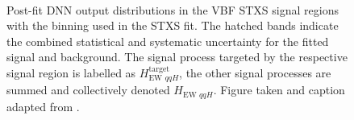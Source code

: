 \begin{figure}[!h]
  \centering
   \\
  \caption[Post-fit DNN output distributions in the VBF STXS signal regions.]{
    Post-fit DNN output distributions in the VBF STXS signal regions with the binning used in the STXS fit.
    The hatched bands indicate the combined statistical and systematic uncertainty for the fitted signal and background.
    The signal process targeted by the respective signal region is labelled as $H_{\text{EW } qqH}^{\mathrm{target}}$, the other signal processes are summed and collectively denoted $H_{\text{EW } qqH}$. 
    Figure taken and caption adapted from . 
    \label{fig:aux:VBF-STXS-SRs}
  }
\end{figure}




